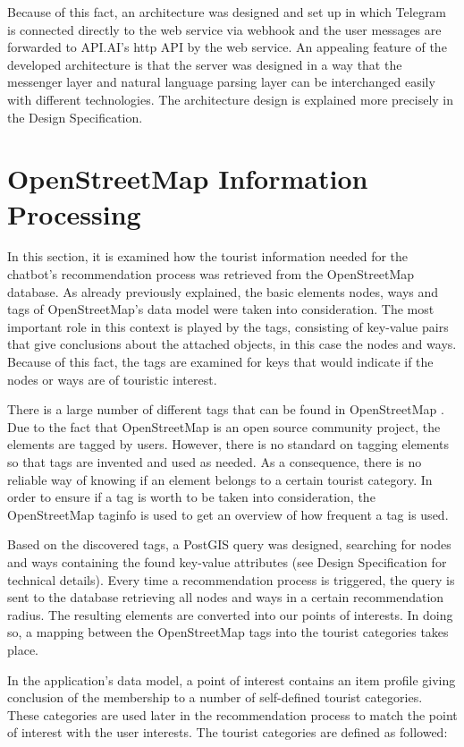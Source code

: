 Because of this fact, an architecture was designed and set up in which Telegram is connected directly to the web service via webhook and the user messages are forwarded to API.AI’s http API by the web service. An appealing feature of the developed architecture is that the server was designed in a way that the messenger layer and natural language parsing layer can be interchanged easily with different technologies. The architecture design is explained more precisely in the Design Specification.

\section{OpenStreetMap Information Processing}
In this section, it is examined how the tourist information needed for the chatbot’s recommendation process was retrieved from the OpenStreetMap database. As already previously explained, the basic elements nodes, ways and tags of OpenStreetMap’s data model were taken into consideration. The most important role in this context is played by the tags, consisting of key-value pairs that give conclusions about the attached objects, in this case the nodes and ways. Because of this fact, the tags are examined for keys that would indicate if the nodes or ways are of touristic interest.

There is a large number of different tags that can be found in OpenStreetMap \cite{osm:map_features}. Due to the fact that OpenStreetMap is an open source community project, the elements are tagged by users. However, there is no standard on tagging elements so that tags are invented and used as needed. As a consequence, there is no reliable way of knowing if an element belongs to a certain tourist category. In order to ensure if a tag is worth to be taken into consideration, the OpenStreetMap taginfo \cite{osm:taginfo} is used to get an overview of how frequent a tag is used.

Based on the discovered tags, a PostGIS query was designed, searching for nodes and ways containing the found key-value attributes (see Design Specification for technical details). Every time a recommendation process is triggered, the query is sent to the database retrieving all nodes and ways in a certain recommendation radius. The resulting elements are converted into our points of interests. In doing so, a mapping between the OpenStreetMap tags into the tourist categories takes place.

In the application’s data model, a point of interest contains an item profile giving conclusion of the membership to a number of self-defined tourist categories. These categories are used later in the recommendation process to match the point of interest with the user interests. The tourist categories are defined as followed:

